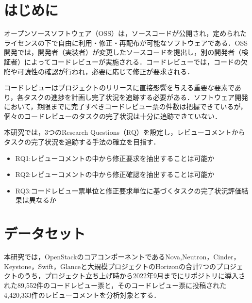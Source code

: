 \documentclass[twocolumn]{jarticle} %
\newcommand{\RQOne}{レビューコメントの中から修正要求を抽出することは可能か}
\newcommand{\RQTwo}{レビューコメントの中から修正確認を抽出することは可能か}
\newcommand{\RQThree}{コードレビュー票単位と修正要求単位に基づくタスクの完了状況評価結果は異なるか}
\begin{document}
\maketitle
\thispagestyle{empty} %




\section{はじめに}\label{sec:intro}

オープンソースソフトウェア（OSS）は，ソースコードが公開され，定められたライセンスの下で自由に利用・修正・再配布が可能なソフトウェアである\cite{oss}．OSS開発では，開発者（実装者）が変更したソースコードを提出し，別の開発者（検証者）によってコードレビューが実施される．コードレビューでは，コードの欠陥や可読性の確認が行われ，必要に応じて修正が要求される．

コードレビューはプロジェクトのリリースに直接影響を与える重要な要素であり，各タスクの進捗を計画し完了状況を追跡する必要がある\cite{review_time}．ソフトウェア開発において，期限までに完了すべきコードレビュー票の件数は把握できているが，個々のコードレビューのタスクの完了状況は十分に追跡できていない．

本研究では，3つのResearch Questions（RQ）を設定し，レビューコメントからタスクの完了状況を追跡する手法の確立を目指す．

\begin{itemize}
\item RQ1:\RQOne
\item RQ2:\RQTwo
\item RQ3:\RQThree
\end{itemize}

\section{データセット}\label{sec:rq1}

本研究では，OpenStackのコアコンポーネントであるNova,Neutron，Cinder，Keystone，Swift，Glanceと大規模プロジェクトのHorizonの合計7つのプロジェクトのうち，プロジェクト立ち上げ時から2022年9月までにリポジトリに導入された89,552件のコードレビュー票と，そのコードレビュー票に投稿された4,420,333件のレビューコメントを分析対象とする．
\end{document}

